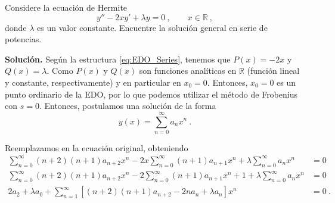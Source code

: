 \begin{ejemplo}
    Considere la ecuación de Hermite
    \begin{equation}
        y'' - 2x y' + \lambda y = 0 \ , \qquad x \in \mathbb{R} \ ,
    \end{equation}
    donde $\lambda$ es un valor constante. Encuentre la solución general en serie de potencias.

    \textbf{Solución.} Según la estructura \eqref{eq:EDO_Series}, tenemos que $P(x) = -2x$ y $Q(x) = \lambda$. Como $P(x)$ y $Q(x)$ son funciones analíticas en $\mathbb{R}$ (función lineal y constante, respectivamente) y en particular en $x_0 = 0$. Entonces, $x_0 = 0$ es un punto ordinario de la EDO, por lo que podemos utilizar el método de Frobenius con $s=0$. Entonces, postulamos una solución de la forma
    \begin{equation}
        y(x) = \sum_{n=0}^\infty a_n x^n \ .
    \end{equation}

    Reemplazamos en la ecuación original, obteniendo
    \begin{align}
        \sum_{n=0}^\infty (n+2)(n+1)a_{n+2}x^n - 2x \sum_{n=0}^\infty (n+1) a_{n+1}x^n + \lambda \sum_{n=0}^\infty a_n x^n & = 0 \\
        \sum_{n=0}^\infty (n+2)(n+1)a_{n+2}x^n - 2 \sum_{n=0}^\infty (n+1) a_{n+1}x^n+1 + \lambda \sum_{n=0}^\infty a_n x^n & = 0 \\
        2 a_2 + \lambda a_0 + \sum_{n=1}^\infty [(n+2)(n+1)a_{n+2} - 2na_n + \lambda a_n]x^n & = 0 \ .
    \end{align}


\end{ejemplo}
